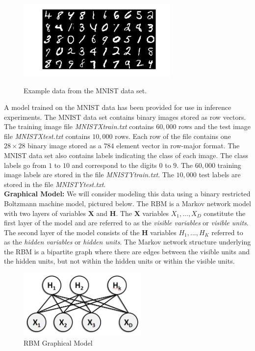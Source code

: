\documentclass[11pt]{article}
\newcommand{\mbf}[1]{{\mathbf{#1}}}
\begin{document}
\begin{figure}[ht]
\centering
\includegraphics[width=3.1in]{Figures/example_digits.png}
\label{fig_data}
\caption{Example data from the MNIST data set.}
\end{figure}

A model trained on the MNIST data has been provided for use in inference experiments.  The MNIST data set contains 
binary images stored as row vectors.
The training image file \textit{MNISTXtrain.txt} contains $60,000$ rows and the test image file \textit{MNISTXtest.txt} contains $10,000$ rows. Each row of the file contains one $28\times 28$ binary image stored as a $784$ element vector in row-major format. The MNIST data set also contains labels indicating the class of each image. The class labels go from $1$ to $10$ and correspond to the digits $0$ to $9$. The $60,000$ training image labels are stored in the file \textit{MNISTYtrain.txt}. The $10,000$ test labels are stored in the file \textit{MNISTYtest.txt}.\\

\textbf{Graphical Model: } We will consider modeling this data using a binary restricted Boltzmann machine model, pictured below. The RBM is a Markov network model with two layers of variables $\mbf{X}$ and $\mbf{H}$. The $\mbf{X}$ variables $X_1,...,X_D$ constitute the first layer of the model and are referred to as the \textit{visible variables} or \textit{visible units}. The second layer of the model consists of the $\mbf{H}$ variables $H_1,...,H_K$ referred to as the \textit{hidden variables} or \textit{hidden units}. The Markov network structure underlying the RBM is a bipartite graph where there are edges between the visible units and the hidden units, but not within the hidden units or within the visible units. \\

\begin{figure}[ht]
\centering
\includegraphics[width=2.5in]{Figures/rbm.png}
\caption{RBM Graphical Model}
\end{figure}
\end{document}
